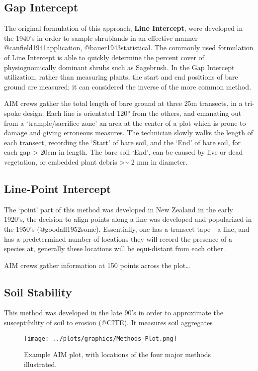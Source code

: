 \documentclass[
]{article}
\begin{document}
\hypertarget{gap-intercept}{%
\subsection{Gap Intercept}\label{gap-intercept}}

The original formulation of this approach, \textbf{Line Intercept}, were
developed in the 1940's in order to sample shrublands in an effective
manner @canfield1941application, @bauer1943statistical. The commonly
used formulation of Line Intercept is able to quickly determine the
percent cover of physiognomically dominant shrubs such as Sagebrush. In
the Gap Intercept utilization, rather than measuring plants, the start
and end positions of bare ground are measured; it can considered the
inverse of the more common method.

AIM crews gather the total length of bare ground at three 25m transects,
in a tri-spoke design. Each line is orientated 120° from the others, and
emanating out from a `trample/sacrifice zone' an area at the center of a
plot which is prone to damage and giving erroneous measures. The
technician slowly walks the length of each transect, recording the
`Start' of bare soil, and the `End' of bare soil, for each gap
\textgreater{} 20cm in length. The bare soil `End', can be caused by
live or dead vegetation, or embedded plant debris
\textgreater\textasciitilde{} 2 mm in diameter.

\hypertarget{line-point-intercept}{%
\subsection{Line-Point Intercept}\label{line-point-intercept}}

The `point' part of this method was developed in New Zealand in the
early 1920's, the decision to align points along a line was developed
and popularized in the 1950's (@goodall1952some). Essentially, one has a
transect tape - a line, and has a predetermined number of locations they
will record the presence of a species at, generally these locations will
be equi-distant from each other.

AIM crews gather information at 150 points across the plot\ldots{}

\hypertarget{soil-stability}{%
\subsection{Soil Stability}\label{soil-stability}}

This method was developed in the late 90's in order to approximate the
susceptibility of soil to erosion (@CITE). It measures soil aggregates

\begin{wrapfigure}{r}{0.5\textwidth}
  \centering
    \texttt{[image: ../plots/graphics/Methods-Plot.png]}
  \caption{Example AIM plot, with locations of the four major methods illustrated.}
\end{wrapfigure}
\end{document}
